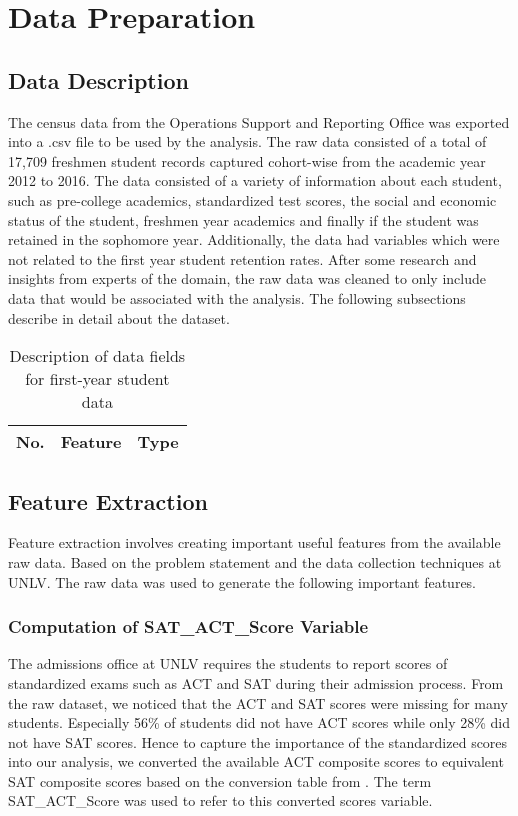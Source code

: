 \documentclass[11pt,openright]{report}
\begin{document}
\section {Data Preparation}
\subsection{Data Description}
The census data from the Operations Support and Reporting Office was exported into a .csv file to be used by the analysis. The raw data consisted of a total of 17,709 freshmen student records captured cohort-wise from the academic year 2012 to 2016. The data consisted of a variety of information about each student, such as pre-college academics, standardized test scores, the social and economic status of the student, freshmen year academics and finally if the student was retained in the sophomore year. Additionally, the data had variables which were not related to the first year student retention rates. After some research and insights from experts of the domain, the raw data was cleaned to only include data that would be associated with the analysis. The following subsections describe in detail about the dataset. 
 
  \begin{table}[!t]
	\renewcommand{\arraystretch}{1.3}
	\caption{Description of data fields for first-year student data}
	\label{table:data_description_db}
	\centering
	\begin{tabular}{|c|c|c|}
		\hline
		\bfseries No. & \bfseries Feature & \bfseries Type  \\
		\hline

	\end{tabular}
\end{table}

 
 
\subsection{Feature Extraction}
Feature extraction involves creating important useful features from the available raw data. Based on the problem statement and the data collection techniques at UNLV. The raw data was used to generate the following important features.

\subsubsection {Computation of SAT\_ACT\_Score Variable}
The admissions office at UNLV requires the students to report scores of standardized exams such as ACT and SAT during their admission process. From the raw dataset, we noticed that the ACT and SAT scores were missing for many students. Especially 56\% of students did not have ACT scores while only 28\% did not have SAT scores. Hence to capture the importance of the standardized scores into our analysis, we converted the available ACT composite scores to equivalent 
SAT composite scores based on the conversion table from \cite{ACTSAT}. The term SAT\_ACT\_Score was used to refer to this converted scores variable.
\end{document}
